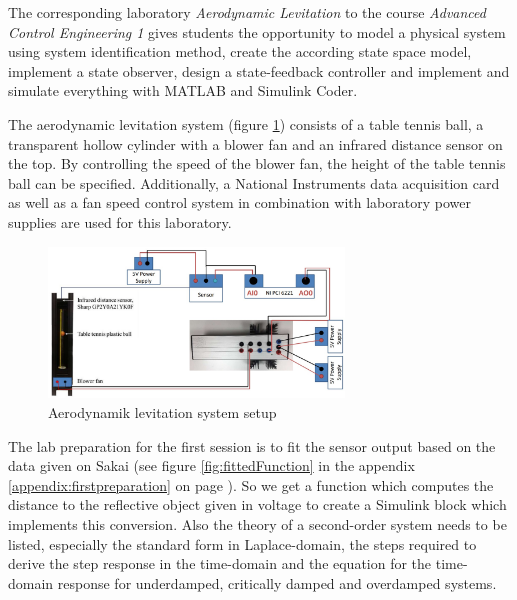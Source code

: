 The corresponding laboratory \textit{Aerodynamic Levitation} to the course \textit{Advanced Control Engineering 1} gives students the opportunity to model a physical system using system identification method, create the according state space model, implement a state observer, design a state-feedback controller and implement and simulate everything with MATLAB and Simulink Coder. \cite{Laborleitfaden}

The aerodynamic levitation system (figure \ref{fig:setupLevitation}) consists of a table tennis ball, a transparent hollow cylinder with a blower fan and an infrared distance sensor on the top. By controlling the speed of the blower fan, the height of the table tennis ball can be specified. Additionally, a National Instruments data acquisition card as well as a fan speed control system in combination with laboratory power supplies are used for this laboratory. \cite{Laborleitfaden}

\FloatBarrier
\begin{figure}[ht]
	\begin{center}
		\includegraphics[width=0.7\textwidth]{figure/setupLevitation.jpg}
		\caption[Aerodynamik levitation system setup \cite{Laborleitfaden}]
                {Aerodynamik levitation system setup \cite{Laborleitfaden}}
		\label{fig:setupLevitation}
	\end{center}
\end{figure}
\FloatBarrier

The lab preparation for the first session is to fit the sensor output based on the data given on Sakai (see figure \ref{fig:fittedFunction} in the appendix \ref{appendix:firstpreparation} on page \pageref{appendix:firstpreparation}). So we get a function which computes the distance to the reflective object given in voltage to create a Simulink block which implements this conversion. Also the theory of a second-order system needs to be listed, especially the standard form in Laplace-domain, the steps required to derive the step response in the time-domain and the equation for the time-domain response for underdamped, critically damped and overdamped systems. 

